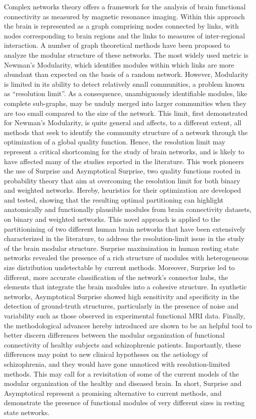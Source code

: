 Complex networks theory offers a framework for the analysis of brain functional connectivity as measured by magnetic resonance imaging.
Within this approach the brain is represented as a graph comprising nodes connected by links, with nodes corresponding to brain regions and the links to measures of inter-regional interaction.
A number of graph theoretical methods have been proposed to analyze the modular structure of these networks.
The most widely used metric is Newman's Modularity, which identifies modules within which links are more abundant than expected on the basis of a random network. However, Modularity is limited in its ability to detect relatively small communities, a problem known as ``resolution limit''.
As a consequence, unambiguously identifiable modules, like complete sub-graphs, may be unduly merged into larger communities when they are too small compared to the size of the network.
This limit, first demonstrated for Newman's Modularity, is quite general and affects, to a different extent, all methods that seek to identify the community structure of a network through the optimization of a global quality function.
Hence, the resolution limit may represent a critical shortcoming for the study of brain networks, and is likely to have affected many of the studies reported in the literature.
This work pioneers the use of Surprise and Asymptotical Surprise, two quality functions rooted in probability theory that aim at overcoming the resolution limit for both binary and weighted networks.
Hereby, heuristics for their optimization are developed and tested, showing that the resulting optimal partitioning can highlight anatomically and functionally plausible modules from brain connectivity datasets, on binary and weighted networks.
This novel approach is applied to the partitionining of two different human brain networks that have been extensively characterized in the literature, to address the resolution-limit issue in the study of the brain modular structure.
Surprise maximization in human resting state networks revealed the presence of a rich structure of modules with heterogeneous size distribution undetectable by current methods.
Moreover, Surprise led to different, more accurate classification of the network's connector hubs, the elements that integrate the brain modules into a cohesive structure.
In synthetic networks, Asymptotical Surprise showed high sensitivity and specificity in the detection of ground-truth structures, particularly in the presence of noise and variability such as those observed in experimental functional MRI data.
Finally, the methodological advances hereby introduced are shown to be an helpful tool to better discern differences between the modular organization of functional connectivity of healthy subjects and schizophrenic patients.
Importantly, these differences may point to new clinical hypotheses on the aetiology of schizophrenia, and they would have gone unnoticed with resolution-limited methods.
This may call for a revisitation of some of the current models of the modular organization of the healthy and diseased brain.
In short, Surprise and Asymptotical represent a promising alternative to current methods, and demonstrate the presence of functional modules of very different sizes in resting state networks.
